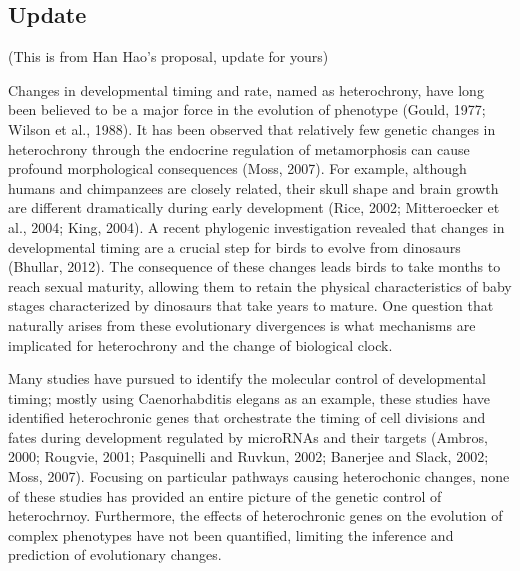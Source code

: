 \documentclass[]{book}
\theoremstyle{definition}
\theoremstyle{definition}
\theoremstyle{remark}
\begin{document}
\subsection{Update}\label{update}

(This is from Han Hao's proposal, update for yours)

Changes in developmental timing and rate, named as heterochrony, have
long been believed to be a major force in the evolution of phenotype
(Gould, 1977; Wilson et al., 1988). It has been observed that relatively
few genetic changes in heterochrony through the endocrine regulation of
metamorphosis can cause profound morphological consequences (Moss,
2007). For example, although humans and chimpanzees are closely related,
their skull shape and brain growth are different dramatically during
early development (Rice, 2002; Mitteroecker et al., 2004; King, 2004). A
recent phylogenic investigation revealed that changes in developmental
timing are a crucial step for birds to evolve from dinosaurs (Bhullar,
2012). The consequence of these changes leads birds to take months to
reach sexual maturity, allowing them to retain the physical
characteristics of baby stages characterized by dinosaurs that take
years to mature. One question that naturally arises from these
evolutionary divergences is what mechanisms are implicated for
heterochrony and the change of biological clock.

Many studies have pursued to identify the molecular control of
developmental timing; mostly using Caenorhabditis elegans as an example,
these studies have identified heterochronic genes that orchestrate the
timing of cell divisions and fates during development regulated by
microRNAs and their targets (Ambros, 2000; Rougvie, 2001; Pasquinelli
and Ruvkun, 2002; Banerjee and Slack, 2002; Moss, 2007). Focusing on
particular pathways causing heterochonic changes, none of these studies
has provided an entire picture of the genetic control of heterochrnoy.
Furthermore, the effects of heterochronic genes on the evolution of
complex phenotypes have not been quantified, limiting the inference and
prediction of evolutionary changes.
\end{document}
